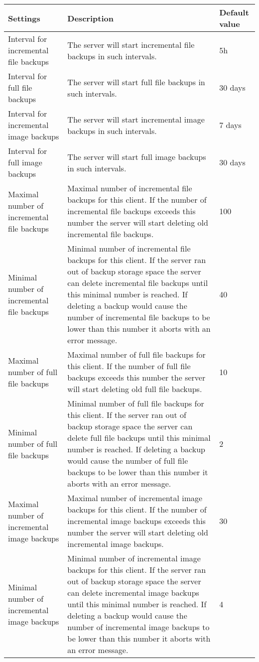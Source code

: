 \documentclass[a4paper,10pt]{article}
\begin{document}
\begin{longtable}{|p{}|p{}|p{}|}
\hline
Settings  & Description & Default value\\
\hline\hline
Interval for incremental file backups & The server will start incremental file backups in such intervals. & 5h\\
\hline
Interval for full file backups & The server will start full file backups in such intervals. & 30 days\\
\hline
Interval for incremental image backups & The server will start incremental image backups in such intervals. & 7 days\\
\hline
Interval for full image backups & The server will start full image backups in such intervals. & 30 days\\
\hline
Maximal number of incremental file backups & Maximal number of incremental file backups for this client. If the number of
 incremental file backups exceeds this number the server will start deleting old incremental file backups. & 100\\
\hline 
Minimal number of incremental file backups & Minimal number of incremental file backups for this client. If the server ran out of backup storage space the server can delete incremental file backups until this minimal number is reached. If deleting a backup would cause the number of incremental file backups to be lower than this number it aborts with an error message. & 40\\
\hline
Maximal number of full file backups & Maximal number of full file backups for this client. If the number of
 full file backups exceeds this number the server will start deleting old full file backups. & 10\\
\hline
Minimal number of full file backups & Minimal number of full file backups for this client. If the server ran out of backup storage space the server can delete full file backups until this minimal number is reached. If deleting a backup would cause the number of full file backups to be lower than this number it aborts with an error message. & 2\\
\hline
Maximal number of incremental image backups & Maximal number of incremental image backups for this client. If the number of incremental image backups exceeds this number the server will start deleting old incremental image backups. & 30\\
\hline
Minimal number of incremental image backups & Minimal number of incremental image backups for this client. If the server ran out of backup storage space the server can delete incremental image backups until this minimal number is reached. If deleting a backup would cause the number of incremental image backups to be lower than this number it aborts with an error message. & 4\\

\end{longtable}
\end{document}
